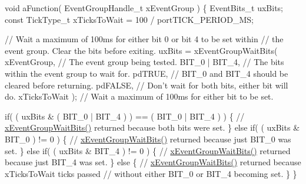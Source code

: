 \begin{DoxyPre}  void aFunction( EventGroupHandle\_t xEventGroup )
  \{
  EventBits\_t uxBits;
  const TickType\_t xTicksToWait = 100 / portTICK\_PERIOD\_MS;\end{DoxyPre}



\begin{DoxyPre}    // Wait a maximum of 100ms for either bit 0 or bit 4 to be set within
    // the event group.  Clear the bits before exiting.
    uxBits = xEventGroupWaitBits(
                xEventGroup,    // The event group being tested.
                BIT\_0 | BIT\_4,  // The bits within the event group to wait for.
                pdTRUE,         // BIT\_0 and BIT\_4 should be cleared before returning.
                pdFALSE,        // Don't wait for both bits, either bit will do.
                xTicksToWait ); // Wait a maximum of 100ms for either bit to be set.\end{DoxyPre}



\begin{DoxyPre}    if( ( uxBits \& ( BIT\_0 | BIT\_4 ) ) == ( BIT\_0 | BIT\_4 ) )
    \{
        // \mbox{\hyperlink{event__groups_8h_aab9d5b405bc57b7624dcabe9a9a503db}{xEventGroupWaitBits()}} returned because both bits were set.
    \}
    else if( ( uxBits \& BIT\_0 ) != 0 )
    \{
        // \mbox{\hyperlink{event__groups_8h_aab9d5b405bc57b7624dcabe9a9a503db}{xEventGroupWaitBits()}} returned because just BIT\_0 was set.
    \}
    else if( ( uxBits \& BIT\_4 ) != 0 )
    \{
        // \mbox{\hyperlink{event__groups_8h_aab9d5b405bc57b7624dcabe9a9a503db}{xEventGroupWaitBits()}} returned because just BIT\_4 was set.
    \}
    else
    \{
        // \mbox{\hyperlink{event__groups_8h_aab9d5b405bc57b7624dcabe9a9a503db}{xEventGroupWaitBits()}} returned because xTicksToWait ticks passed
        // without either BIT\_0 or BIT\_4 becoming set.
    \}
  \}
  \end{DoxyPre}
 